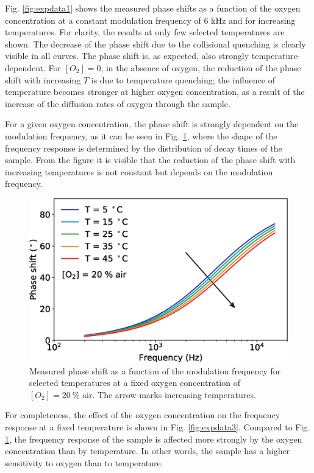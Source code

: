 \documentclass[sensors,article,submit,moreauthors,pdftex,10pt,a4paper]{Definitions/mdpi}
\begin{document}
Fig. \ref{fig:expdata1} shows the measured phase shifts as a function of the oxygen concentration at a constant modulation frequency of 6 kHz and for increasing temperatures. For clarity, the results at only few selected temperatures are shown. The decrease of the phase shift due to the collisional quenching is clearly visible in all curves. The phase shift is, as expected, also strongly  temperature-dependent. For $[O_2]=0$, in the absence of oxygen, the reduction of the phase shift with increasing $T$ is due to temperature quenching; the influence of temperature becomes stronger at higher oxygen concentration, as a result of the increase of the diffusion rates of oxygen through the sample.

For a given oxygen concentration, the phase shift is strongly dependent on the modulation frequency, as it can be seen in Fig. \ref{fig:expdata2}, where the shape of the frequency response is determined by the distribution of decay times of the sample. From the figure it is visible that the reduction of the phase shift with increasing temperatures is not constant but depends on the modulation frequency.

\begin{figure}[t!]
\centering
\includegraphics[width=8.2 cm]{phase_f_T.eps}
\caption{Measured phase shift as a function of the modulation frequency for selected temperatures at a fixed oxygen concentration of $[O_2]=20 \  \%$ air. The arrow marks increasing temperatures.}
\label{fig:expdata2}
\end{figure}

For completeness, the effect of the oxygen concentration on the frequency response at a fixed temperature is shown in Fig. \ref{fig:expdata3}. Compared to Fig. \ref{fig:expdata2}, the frequency response of the sample is affected more strongly by the oxygen concentration than by temperature. In other words, the sample has a higher sensitivity to oxygen than to temperature.
\end{document}
